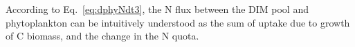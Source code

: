 \documentclass[gmd, manuscript]{copernicus}
\newcommand{\onur}[1]{\textcolor{blue}{\{Onur: #1\}}}
\begin{document}

According to Eq.~\ref{eq:dphyNdt3}, the N flux between the DIM pool and phytoplankton can be intuitively understood as the sum of uptake due to growth of C biomass, and the change in the N quota. %
\end{document}

